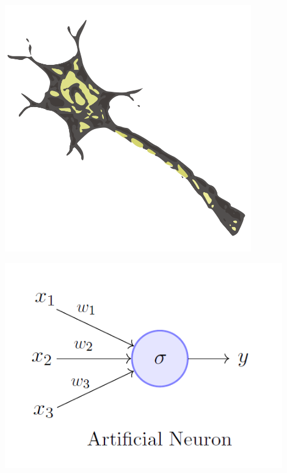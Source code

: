 \documentclass[aspectratio=43,usenames,dvipsnames]{beamer}
\begin{document}
\begin{frame}
\begin{center}
\includegraphics[width=0.8\textwidth, keepaspectratio]{images/neuron} 
\end{center}
\end{frame}

\begin{frame}
\begin{center}
\includegraphics[width=0.9\textwidth, keepaspectratio]{images/perceptron} 
\end{center}
\end{frame}
\end{document}
